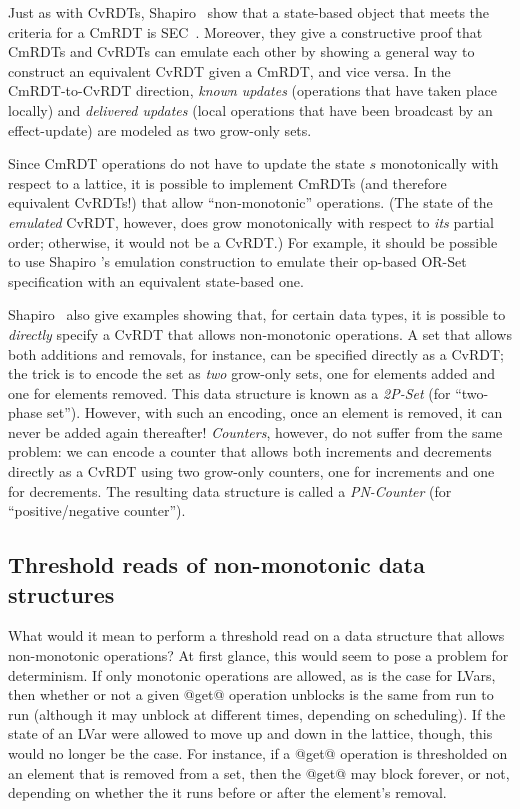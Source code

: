 \documentclass{article}
\begin{document}
Just as with CvRDTs, Shapiro \etal~show that a state-based object that
meets the criteria for a CmRDT is SEC~\cite{crdts}.  Moreover, they
give a constructive proof that CmRDTs and CvRDTs can emulate each
other by showing a general way to construct an equivalent CvRDT given
a CmRDT, and vice versa.  In the CmRDT-to-CvRDT direction, \emph{known
  updates} (operations that have taken place locally) and
\emph{delivered updates} (local operations that have been broadcast by
an effect-update) are modeled as two grow-only sets.

Since CmRDT operations do not have to update the state $s$
monotonically with respect to a lattice, it is possible to implement
CmRDTs (and therefore equivalent CvRDTs!) that allow ``non-monotonic''
operations.  (The state of the \emph{emulated} CvRDT, however, does
grow monotonically with respect to \emph{its} partial order;
otherwise, it would not be a CvRDT.) For example, it should be
possible to use Shapiro \etal's emulation construction to emulate
their op-based OR-Set specification with an equivalent state-based
one.

Shapiro \etal~also give examples showing that, for certain data types,
it is possible to \emph{directly} specify a CvRDT that allows
non-monotonic operations.  A set that allows both additions and
removals, for instance, can be specified directly as a CvRDT; the
trick is to encode the set as \emph{two} grow-only sets, one for
elements added and one for elements removed.  This data structure is
known as a \emph{2P-Set} (for ``two-phase set'').  However, with such
an encoding, once an element is removed, it can never be added again
thereafter!  \emph{Counters}, however, do not suffer from the same
problem: we can encode a counter that allows both increments and
decrements directly as a CvRDT using two grow-only counters, one for
increments and one for decrements. The resulting data structure is
called a \emph{PN-Counter} (for ``positive/negative counter'').

\subsection{Threshold reads of non-monotonic data structures}

What would it mean to perform a threshold read on a data structure
that allows non-monotonic operations?  At first glance, this would
seem to pose a problem for determinism. If only monotonic operations
are allowed, as is the case for LVars, then whether or not a given
@get@ operation unblocks is the same from run to run (although it may
unblock at different times, depending on scheduling).  If the state of
an LVar were allowed to move up and down in the lattice, though, this
would no longer be the case. For instance, if a @get@ operation is
thresholded on an element that is removed from a set, then the @get@
may block forever, or not, depending on whether the it runs before or
after the element's removal.
\end{document}
